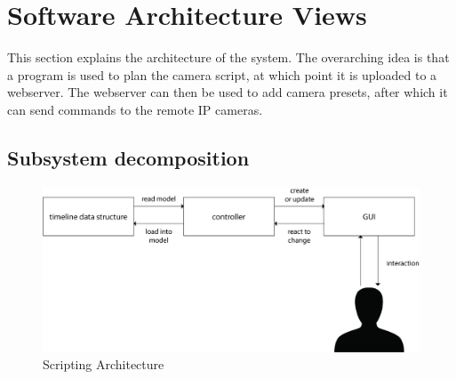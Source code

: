 \documentclass[11pt,twoside,a4paper]{article}
\begin{document}
\clearpage %

\section{Software Architecture Views}
This section explains the architecture of the system. The overarching idea is that a program is used to plan the camera script, at which point it is uploaded to a webserver. The webserver can then be used to add camera presets, after which it can send commands to the remote IP cameras.
\subsection{Subsystem decomposition}
\begin{figure}[H]
	\centering
	\includegraphics[width=\textwidth]{architecture-decomposition}
	\caption{Scripting Architecture}
	\label{fig:archdecomp}
\end{figure}
\end{document}
